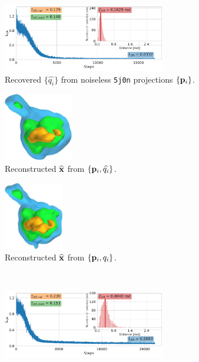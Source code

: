 \begin{figure}[t]
    \centering
    \begin{subfigure}[b]{0.44\linewidth}
        \centering
        \includegraphics[height=8em]{figures/5j0n_noise0_ar_aa}
        \caption{Recovered $\{ \widehat{q_i} \}$ from noiseless \texttt{5j0n} projections $\{ \mathbf{p}_i \}$.
        }%
        \label{fig:5j0n-noise0-orientation-recovery}
    \end{subfigure}
    \hfill
    \begin{subfigure}[b]{0.26\linewidth}
        \centering
        \includegraphics[height=8em]{figures/5j0n_reconstruction_noise0}
        \caption{Reconstructed $\widehat{\mathbf{x}}$ from $\{ \mathbf{p}_i, \widehat{q_i} \}$.}%
        \label{fig:5j0n-noise0-reconstruction-recovered}
    \end{subfigure}
    \hfill
    \begin{subfigure}[b]{0.26\linewidth}
        \centering
        \includegraphics[height=8em]{figures/5j0n_reconstruction_GT}
        \caption{Reconstructed $\widehat{\mathbf{x}}$ from $\{ \mathbf{p}_i, q_i \}$.}%
        \label{fig:5j0n-noise0-reconstruction-true}
    \end{subfigure}
    \\ \vspace{1em}
    \begin{subfigure}[b]{0.44\linewidth}
        \centering
        \includegraphics[height=8em]{figures/5j0n_noise16_ar_aa}

\end{subfigure}
\end{figure}

